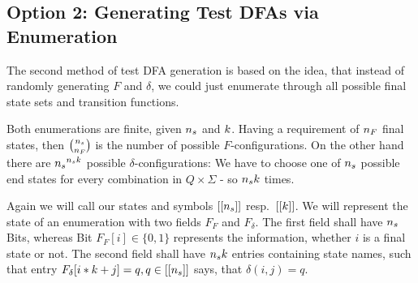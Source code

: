 \subsection{Option 2: Generating Test DFAs via Enumeration}


The second method of test DFA generation is based on the idea, that instead of randomly generating $F$ and $\delta$, we could just enumerate through all possible final state sets and transition functions.


Both enumerations are finite, given ${n_s}$ and $k$. Having a requirement of ${n_F}$ final states, then $\binom{{n_s}}{{n_F}}$ is the number of possible $F$-configurations. On the other hand there are ${n_s}^{{n_s}k}$ possible $\delta$-configurations: We have to choose one of ${n_s}$ possible end states for every combination in $Q\times\Sigma$ - so ${n_s}k$ times.


Again we will call our states and symbols $[[{n_s}]]$ resp.\ $[[k]]$. We will represent the state of an enumeration with two fields $F_F$ and $F_\delta$. The first field shall have ${n_s}$ Bits, whereas Bit $F_F[i] \in \{0,1\}$ represents the information, whether $i$ is a final state or not. The second field shall have ${n_s}k$ entries containing state names, such that entry $F_\delta[i * k + j] = q, q\in [[{n_s}]]$ says, that $\delta(i, j) = q$.


